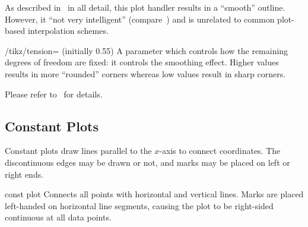 {As described in~\cite{tikz} in all detail, this plot handler results in a ``smooth'' outline. However, it ``not very intelligent'' (compare~\cite{tikz}) and is unrelated to common plot-based interpolation schemes. 

\begin{key}{/tikz/tension= (initially 0.55)}
	A parameter which controls how the remaining degrees of freedom are fixed: it controls the smoothing effect. Higher values results in more ``rounded'' corners whereas low values result in sharp corners.
	
	Please refer to~\cite{tikz} for details.
\end{key}


\subsection{Constant Plots}
Constant plots draw lines parallel to the $x$-axis to connect coordinates. The discontinuous edges may be drawn or not, and marks may be placed on left or right ends.

\begin{plottype}{const plot}
Connects all points with horizontal and vertical lines. Marks are placed left-handed on horizontal line segments, causing the plot to be right-sided continuous at all data points.

\begin{codeexample}[]
\end{codeexample}


\begin{codeexample}[]
\end{codeexample}
\end{plottype}

}

